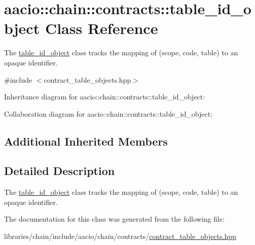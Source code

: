\hypertarget{classaacio_1_1chain_1_1contracts_1_1table__id__object}{}\section{aacio\+:\+:chain\+:\+:contracts\+:\+:table\+\_\+id\+\_\+object Class Reference}
\label{classaacio_1_1chain_1_1contracts_1_1table__id__object}


The \mbox{\hyperlink{classaacio_1_1chain_1_1contracts_1_1table__id__object}{table\+\_\+id\+\_\+object}} class tracks the mapping of (scope, code, table) to an opaque identifier.  




{\ttfamily \#include $<$contract\+\_\+table\+\_\+objects.\+hpp$>$}



Inheritance diagram for aacio\+:\+:chain\+:\+:contracts\+:\+:table\+\_\+id\+\_\+object\+:


Collaboration diagram for aacio\+:\+:chain\+:\+:contracts\+:\+:table\+\_\+id\+\_\+object\+:
\subsection*{Additional Inherited Members}


\subsection{Detailed Description}
The \mbox{\hyperlink{classaacio_1_1chain_1_1contracts_1_1table__id__object}{table\+\_\+id\+\_\+object}} class tracks the mapping of (scope, code, table) to an opaque identifier. 

The documentation for this class was generated from the following file\+:\begin{DoxyCompactItemize}
\item 
libraries/chain/include/aacio/chain/contracts/\mbox{\hyperlink{contract__table__objects_8hpp}{contract\+\_\+table\+\_\+objects.\+hpp}}\end{DoxyCompactItemize}

